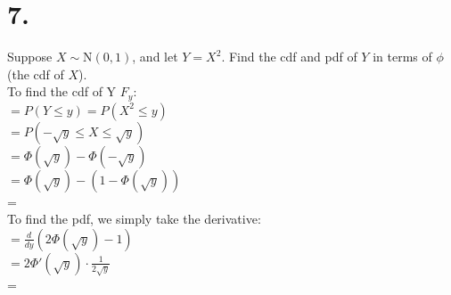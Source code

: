 \documentclass{article}
\begin{document}
\section*{7.}
{\Large 
Suppose $X\sim\mathrm N({0,1})$, and let $Y=X^{2}$. Find the cdf and pdf of $Y$ in terms of $\phi$ (the cdf of $X$). \\
To find the cdf of Y $F_y$: \\
$= P(Y \leq y) = P(X^2 \leq y)$ \\ 
$= P(-\sqrt{y} \leq X \leq \sqrt{y})$ \\
$ = \Phi(\sqrt{y}) - \Phi(-\sqrt{y})$ \\
$ = \Phi(\sqrt{y}) - (1 - \Phi(\sqrt{y}))$ \\
=  \\ 
To find the pdf, we simply take the derivative: \\ 
$ = \frac{d}{dy} (2\Phi(\sqrt{y}) - 1)$ \\ 
$ = 2\Phi'(\sqrt{y}) \cdot \frac{1}{2\sqrt{y}}$ \\ 
= 

}
\end{document}
